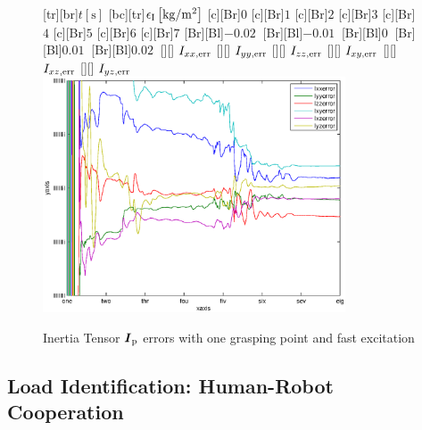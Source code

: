 \begin{figure}
	\centering	
	[tr][br]{$t\left[\mathrm{s}\right]$}
	[bc][tr]{$\epsilon_{\mathrm{I}}\left[\mathrm{kg}/\mathrm{m}^2\right]$}
	[Br]{$0$}
	[Br]{$1$}
	[Br]{$2$}
	[Br]{$3$}
	[Br]{$4$}
	[Br]{$5$}
	[Br]{$6$}
	[Br]{$7$}
	[Br][Bl]{$-0.02\  $}
	[Br][Bl]{$-0.01\ $}
	[Br][Bl]{$0\  $}
	[Br][Bl]{$0.01\  $}
	[Br][Bl]{$0.02\  $}
	[][]{\tiny \hspace{0.5cm} $I_{xx,\mathrm{err}}$}
	[][]{\tiny \hspace{0.5cm} $I_{yy,\mathrm{err}}$}
	[][]{\tiny \hspace{0.5cm} $I_{zz,\mathrm{err}}$}
	[][]{\tiny \hspace{0.5cm} $I_{xy,\mathrm{err}}$}
	[][]{\tiny \hspace{0.5cm} $I_{xz,\mathrm{err}}$}
	[][]{\tiny \hspace{0.5cm} $I_{yz,\mathrm{err}}$}
	\includegraphics[width=0.8\textwidth]{figures/one_grasping_point_fast_inertias.eps}
	\vspace{0.2cm}
	\caption[Inertia errors, one grasping point, fast excitation]{Inertia Tensor $\boldsymbol{I}_{\mathrm{p}}$ errors with one grasping point and fast excitation}
	\label{fig:estim_inertia_one_fast}
\end{figure}

\subsection{Load Identification: Human-Robot Cooperation}

